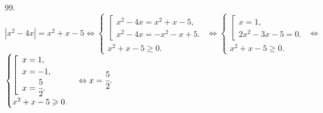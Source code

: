 99. $|x^2-4x|=x^2+x-5\Leftrightarrow \begin{cases}\left[\begin{array}{l} x^2-4x=x^2+x-5,\\ x^2-4x=-x^2-x+5.\end{array}\right.\\x^2+x-5\geqslant0.\end{cases}
\Leftrightarrow \begin{cases}\left[\begin{array}{l} x=1,\\ 2x^2-3x-5=0.\end{array}\right.\\x^2+x-5\geqslant0.\end{cases}
\Leftrightarrow$\\$ \begin{cases}\left[\begin{array}{l} x=1,\\ x=-1,\\ x=\cfrac{5}{2}.\end{array}\right.\\x^2+x-5\geqslant0.\end{cases}
\Leftrightarrow x=\cfrac{5}{2}.$\\
